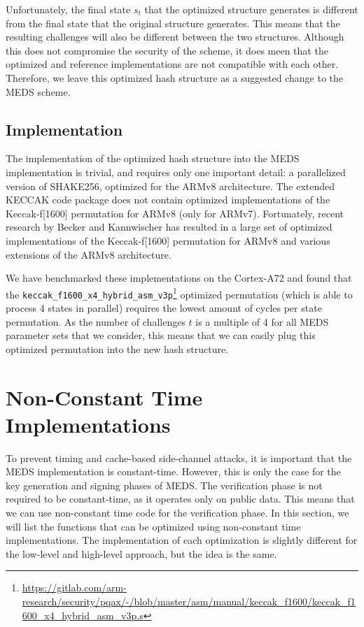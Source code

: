 \documentclass[11pt,a4paper]{report}
\theoremstyle{definition}
\begin{document}
Unfortunately, the final state $s_t$ that the optimized structure generates is different from the final state that the original structure generates. This means that the resulting challenges will also be different between the two structures. Although this does not compromise the security of the scheme, it does meen that the optimized and reference implementations are not compatible with each other. Therefore, we leave this optimized hash structure as a suggested change to the MEDS scheme.

\subsection{Implementation}
The implementation of the optimized hash structure into the MEDS implementation is trivial, and requires only one important detail: a parallelized version of SHAKE256, optimized for the ARMv8 architecture. The extended KECCAK code package does not contain optimized implementations of the Keccak-f[1600] permutation for ARMv8 (only for ARMv7). Fortunately, recent research by Becker and Kannwischer has resulted in a large set of optimized implementations of the Keccak-f[1600] permutation for ARMv8 and various extensions of the ARMv8 architecture.

We have benchmarked these implementations on the Cortex-A72 and found that the \texttt{keccak\_f1600\_x4\_hybrid\_asm\_v3p}\footnote{\url{https://gitlab.com/arm-research/security/pqax/-/blob/master/asm/manual/keccak\_f1600/keccak\_f1600\_x4\_hybrid\_asm\_v3p.s}} optimized permutation (which is able to process 4 states in parallel) requires the lowest amount of cycles per state permutation. As the number of challenges $t$ is a multiple of 4 for all MEDS parameter sets that we consider, this means that we can easily plug this optimized permutation into the new hash structure.

\section{Non-Constant Time Implementations}
\label{sec:nonconstanttime}
To prevent timing and cache-based side-channel attacks, it is important that the MEDS implementation is constant-time. However, this is only the case for the key generation and signing phases of MEDS. The verification phase is not required to be constant-time, as it operates only on public data. This means that we can use non-constant time code for the verification phase. In this section, we will list the functions that can be optimized using non-constant time implementations. The implementation of each optimization is slightly different for the low-level and high-level approach, but the idea is the same.
\end{document}
